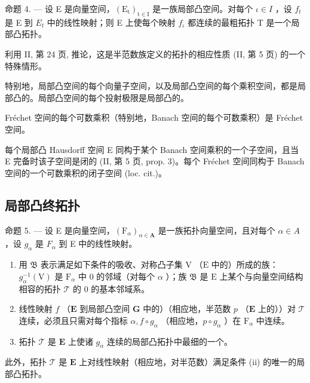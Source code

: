 命题 4. --- 设 E 是向量空间，\((\mathrm{E}_{\mathrm{t}})_{\mathrm{t}\in\mathrm{I}}\) 是一族局部凸空间。对每个 \(\iota\in I\) ，设 \(f_{t}\) 是 E 到 \(E_{t}\) 中的线性映射；则 E 上使每个映射 \(f_{\iota}\) 都连续的最粗拓扑 T 是一个局部凸拓扑。

利用 II, 第 24 页, 推论，这是半范数族定义的拓扑的相应性质 (II, 第 5 页) 的一个特殊情形。

特别地，局部凸空间的每个向量子空间，以及局部凸空间的每个乘积空间，都是局部凸的。局部凸空间的每个投射极限是局部凸的。

Fréchet 空间的每个可数乘积（特别地，Banach 空间的每个可数乘积）是 Fréchet 空间。

每个局部凸 Hausdorff 空间 E 同构于某个 Banach 空间乘积的一个子空间，且当 E 完备时该子空间是闭的 (II, 第 5 页, prop. 3)。每个 Fréchet 空间同构于 Banach 空间的一个可数乘积的闭子空间 (loc. cit.)。

\subsection{局部凸终拓扑}

命题 5. --- 设 E 是向量空间，\((\mathrm{F}_{\alpha})_{\alpha\in\mathbf{A}}\) 是一族拓扑向量空间，且对每个 \(\alpha\in A\) ，设 \(g_{\alpha}\) 是 \(F_{\alpha}\) 到 E 中的线性映射。

\begin{enumerate}
\def\labelenumi{(\roman{enumi})}
\item
  用 \(\mathfrak{B}\) 表示满足如下条件的吸收、对称凸子集 \(\mathrm{V}\) （\(\mathrm{E}\) 中的）所成的族：\(g_{\alpha}^{-1}(\mathrm{V})\) 是 \(\mathrm{F}_{\alpha}\) 中 0 的邻域（对每个 \(\alpha\) ）；族 \(\mathfrak{B}\) 是 \(\mathrm{E}\) 上某个与向量空间结构相容的拓扑 \(\mathcal{T}\) 的 0 的基本邻域系。
\item
  线性映射 \(f\) （\(\mathbf{E}\) 到局部凸空间 \(\mathbf{G}\) 中的）（相应地，半范数 \(p\) （\(\mathbf{E}\) 上的））对 \(\mathcal{T}\) 连续，必须且只需对每个指标 \(\alpha, f \circ g_{\alpha}\) （相应地，\(p \circ g_{\alpha}\) ）在 \(\mathrm{F}_{\alpha}\) 中连续。
\item
  拓扑 \(\mathcal{T}\) 是 \(\mathbf{E}\) 上使诸 \(g_{\alpha}\) 连续的局部凸拓扑中最细的一个。
\end{enumerate}

此外，拓扑 \(\mathcal{T}\) 是 \(\mathbf{E}\) 上对线性映射（相应地，对半范数）满足条件 (ii) 的唯一的局部凸拓扑。

